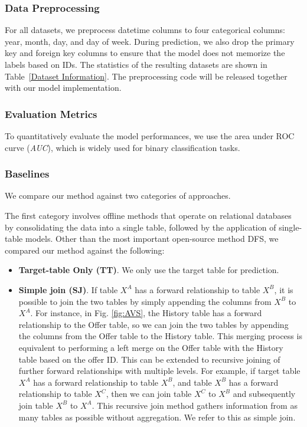 \subsubsection{Data Preprocessing}

For all datasets, we preprocess datetime columns to four categorical columns: year, month, day, and day of week.  During prediction, we also drop the primary key and foreign key columns to ensure that the model does not memorize the labels based on IDs.  The statistics of the resulting datasets are shown in Table~\ref{Dataset Information}. The preprocessing code will be released together with our model implementation.

\subsubsection{Evaluation Metrics}
To quantitatively evaluate the model performances, we use the area under ROC curve (\textit{AUC}), which is widely used for binary classification tasks.

\subsubsection{Baselines}
We compare our method against two categories of approaches.

The first category involves offline methods that operate on relational databases by consolidating the data into a single table, followed by the application of single-table models. Other than the most important open-source method DFS, we compared our method against the following:
\begin{itemize}[leftmargin=*]
    \item \textbf{Target-table Only (TT)}.  We only use the target table for prediction.
    \item \textbf{Simple join (SJ)}.  If table $X^A$ has a forward relationship to table $X^B$, it is possible to join the two tables by simply appending the columns from $X^B$ to $X^A$. For instance, in Fig. \ref{fig:AVS}, the History table has a forward relationship to the Offer table, so we can join the two tables by appending the columns from the Offer table to the History table. This merging process is equivalent to performing a left merge on the Offer table with the History table based on the offer ID. This can be extended to recursive joining of further forward relationships with multiple levels. For example, if target table $X^A$ has a forward relationship to table $X^B$, and table $X^B$ has a forward relationship to table $X^C$, then we can join table $X^C$ to $X^B$ and subsequently join table $X^B$ to $X^A$. This recursive join method gathers information from as many tables as possible without aggregation.  We refer to this as simple join.
\end{itemize}


